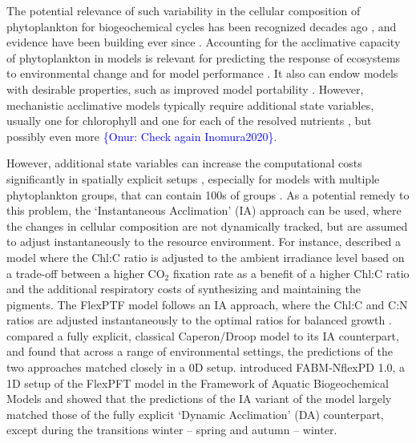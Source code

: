 \documentclass[gmd, manuscript]{copernicus}
\newcommand{\onur}[1]{\textcolor{blue}{\{Onur: #1\}}}
\begin{document}
The potential relevance of such variability in the cellular composition of phytoplankton for biogeochemical cycles has been recognized decades ago \citet{Redfield1934,Redfield1958}, and evidence have been building ever since \citep{Lenton2007,Bonachela2016,Pahlow2020}.  Accounting for the acclimative capacity of phytoplankton in models is relevant for predicting the response of ecosystems to environmental change \citep{Kwiatkowski2018,Kerimoglu2018} and for model performance \citep{Ayata2013, Kerimoglu2017, Chen2018a}.  It also can endow models with desirable properties, such as improved model portability \citep{Anugerahanti2021}. However, mechanistic acclimative models typically require additional state variables, usually one for chlorophyll and one for each of the resolved nutrients \citep[e.g.,][]{Geider1998, Flynn2003}, but possibly even more \citep{Bonachela2013, Wirtz2016, Inomura2020} \onur{Check again Inomura2020}.

However, additional state variables can increase the computational costs significantly in spatially explicit setups \citep{Fulton2003}, especially for models with multiple phytoplankton groups, that can contain 100s of groups \citep[e.g.,][]{Dutkiewicz2020}. As a potential remedy to this problem, the `Instantaneous Acclimation' (IA) approach can be used, where the changes in cellular composition are not dynamically tracked, but are assumed to adjust instantaneously to the resource environment. For instance, \citet{Pahlowetal13} described a model where the Chl:C ratio is adjusted to the ambient irradiance level based on a trade-off between a higher CO$_{2}$ fixation rate as a benefit of a higher Chl:C ratio and the additional respiratory costs of synthesizing and maintaining the pigments.  The FlexPTF model \citep{Smith2016} follows an IA approach, where the Chl:C and C:N ratios are adjusted instantaneously to the optimal ratios for balanced growth \citep{Burmaster1979}.  \citet{Ward2017} compared a fully explicit, classical Caperon/Droop model \citep{Caperon1968,Droop1968} to its IA counterpart, and found that across a range of environmental settings, the predictions of the two approaches matched closely in a 0D setup.  \citet{Kerimoglu2021} introduced FABM-NflexPD 1.0, a 1D setup of the FlexPFT model in the Framework of Aquatic Biogeochemical Models \citep[FABM,][]{Bruggeman2014} and showed that the predictions of the IA variant of the model largely matched those of the fully explicit `Dynamic Acclimation' (DA) counterpart, except during the transitions winter -- spring and autumn -- winter.
\end{document}
